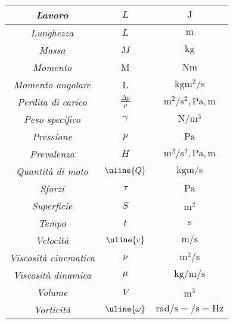\begin{longtable}{ccc}
			\midrule
				\textit{Lavoro}		&		$L$		&		$\si{\joule}$\\
			\midrule			
				\textit{Lunghezza}		&		$L$		&		$\si{\meter}$\\
			\midrule
				\textit{Massa}		&		$M$		&		$\si{\kilogram}$\\
			\midrule
				\textit{Momento}		&		M		&		$\si{\newton \meter}$\\
			\midrule
				\textit{Momento angolare}		&		L		&		$\si{\kilo \gram \square \meter \per \second}$\\
			\midrule
				\textit{Perdita di carico}		&		$\frac{\Delta p}{\rho}$		&		$\si{\square\meter \per \square \second}, \si{\pascal}, \si{\meter}$\\
			\midrule
				\textit{Peso specifico}		&		$\gamma$		&		$\si{\newton \per \cubic \meter}$\\
			\midrule
				\textit{Pressione}		&		$p$		&		$\si{\pascal}$	\\
			\midrule
				\textit{Prevalenza}		&		$H$		&		$\si{\square\meter \per \square \second}, \si{\pascal}, \si{\meter}$\\
			\midrule
				\textit{Quantità di moto}		&		$\uline{Q}$		&		$\si{\kilogram  \meter \per \second}$\\
			\midrule
				\textit{Sforzi}		&		$\tau$		&		$\si{\pascal}$	\\
			\bottomrule	
				\textit{Superficie}		&		$S$		&		$\si{\square \meter}$\\
			\midrule	
				\textit{Tempo}		&		$t$		&		$\si{\second}$\\
			\midrule
				\textit{Velocità}		&		$\uline{v}$		&		$\si{\meter \per \second}$\\
			\midrule
				\textit{Viscosità cinematica}		&		$\nu$		&		$\si{\square \meter \per \second}$\\
			\midrule
				\textit{Viscosità dinamica}		&		$\mu$		&		$\si{\kilo \gram \per \meter \per \second}$\\
			\midrule
				\textit{Volume}		&		$V$		&		$\si{\meter^3}$\\			
			\midrule
				\textit{Vorticità}		&		$\uline{\omega}$		&		$\si{\radian \per \second} = \si{\per \second} = \si{\hertz}$\\								
			\bottomrule
		\end{longtable}
\clearpage

